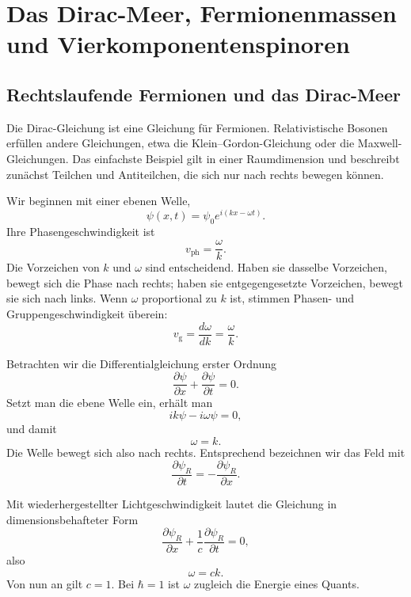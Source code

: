 \chapter{Das Dirac-Meer, Fermionenmassen und Vierkomponentenspinoren}

\section{Rechtslaufende Fermionen und das Dirac-Meer}

Die Dirac-Gleichung ist eine Gleichung für Fermionen. Relativistische Bosonen erfüllen andere Gleichungen, etwa die Klein--Gordon-Gleichung oder die Maxwell-Gleichungen. Das einfachste Beispiel gilt in einer Raumdimension und beschreibt zunächst Teilchen und Antiteilchen, die sich nur nach rechts bewegen können.

Wir beginnen mit einer ebenen Welle,
\begin{equation}
\psi(x,t)=\psi_0 e^{i(kx-\omega t)}.
\end{equation}
Ihre Phasengeschwindigkeit ist
\begin{equation}
v_{\mathrm{ph}}=\frac{\omega}{k}.
\end{equation}
Die Vorzeichen von \(k\) und \(\omega\) sind entscheidend. Haben sie dasselbe Vorzeichen, bewegt sich die Phase nach rechts; haben sie entgegengesetzte Vorzeichen, bewegt sie sich nach links. Wenn \(\omega\) proportional zu \(k\) ist, stimmen Phasen- und Gruppengeschwindigkeit überein:
\begin{equation}
v_{\mathrm{g}}=\frac{d\omega}{dk}=\frac{\omega}{k}.
\end{equation}

Betrachten wir die Differentialgleichung erster Ordnung
\begin{equation}
\frac{\partial\psi}{\partial x}
+
\frac{\partial\psi}{\partial t}
=0.
\end{equation}
Setzt man die ebene Welle ein, erhält man
\begin{equation}
ik\psi-i\omega\psi=0,
\end{equation}
und damit
\begin{equation}
\omega=k.
\end{equation}
Die Welle bewegt sich also nach rechts. Entsprechend bezeichnen wir das Feld mit
\begin{equation}
\frac{\partial\psi_R}{\partial t}
=
-\frac{\partial\psi_R}{\partial x}.
\end{equation}

Mit wiederhergestellter Lichtgeschwindigkeit lautet die Gleichung in dimensionsbehafteter Form
\begin{equation}
\frac{\partial\psi_R}{\partial x}
+
\frac{1}{c}\frac{\partial\psi_R}{\partial t}
=0,
\end{equation}
also
\begin{equation}
\omega=ck.
\end{equation}
Von nun an gilt \(c=1\). Bei \(\hbar=1\) ist \(\omega\) zugleich die Energie eines Quants.


